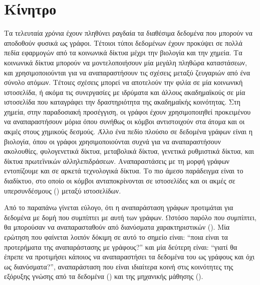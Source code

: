 \section{Κίνητρο}
Τα τελευταία χρόνια έχουν πληθύνει ραγδαία τα διαθέσιμα δεδομένα που μπορούν να αποδοθούν φυσικά ως γράφοι.
Τέτοιοι τύποι δεδομένων έχουν προκύψει σε πολλά πεδία εφαρμογών από τα κοινωνικά δίκτυα μέχρι την βιολογία και την χημεία. Τα κοινωνικά δίκτυα μπορούν να μοντελοποιήσουν μία μεγάλη πληθώρα καταστάσεων, και χρησιμοποιούνται για να αναπαραστήσουν τις σχέσεις μεταξύ ζευγαριών από ένα σύνολο ατόμων.
Τέτοιες σχέσεις μπορεί να αποτελούν την φιλία σε μία κοινωνική ιστοσελίδα, ή ακόμα τις συνεργασίες με ιδρύματα και άλλους ακαδημαϊκούς σε μία ιστοσελίδα που καταγράφει την δραστηριότητα της ακαδημαϊκής κοινότητας.
Στη χημεία, στην παραδοσιακή προσέγγιση, οι γράφοι έχουν χρησιμοποιηθεί προκειμένου να αναπαραστήσουν μόρια όπου συνήθως οι κόμβοι αντιστοιχούν στα άτομα και οι ακμές στους χημικούς δεσμούς.
Άλλο ένα πεδίο πλούσιο σε δεδομένα γράφων είναι η βιολογία, όπου οι γράφοι χρησιμοποιούνται συχνά για να αναπαραστήσουν  ακολουθίες, φυλογενετικά δίκτυα, μεταβολικά δίκτυα, γενετικά ρυθμιστικά δίκτυα, και δίκτυα πρωτεϊνικών αλληλεπιδράσεων.
Αναπαραστάσεις με τη μορφή γράφων εντοπίζουμε και σε αρκετά τεχνολογικά δίκτυα.
Το πιο άμεσο παράδειγμα είναι το διαδίκτυο, στο οποίο οι κόμβοι ανταποκρίνονται σε ιστοσελίδες και οι ακμές σε υπερσυνδέσμους () μεταξύ ιστοσελίδων.\par
Από το παραπάνω γίνεται εύλογο, ότι η αναπαράσταση γράφων προτιμάται για δεδομένα με δομή που συμπίπτει με αυτή των γράφων.
Ωστόσο παρόλο που συμπίπτει, θα μπορούσαν να αναπαρασταθούν από διανύσματα χαρακτηριστικών ().
Μία ερώτηση που φαίνεται λοιπόν δόκιμη σε αυτό το σημείο είναι: ``ποια είναι τα προτερήματα της αναπαράστασης με γράφους?'' και μία δεύτερη είναι: ``γιατί θα έπρεπε να προτιμήσει κάποιος να αναπαραστήσει τα δεδομένα του ως γράφους και όχι ως διανύσματα?'', αναπαράσταση που είναι ιδιαίτερα κοινή στις κοινότητες της εξόρυξης γνώσης από τα δεδομένα () και της μηχανικής μάθησης ().
